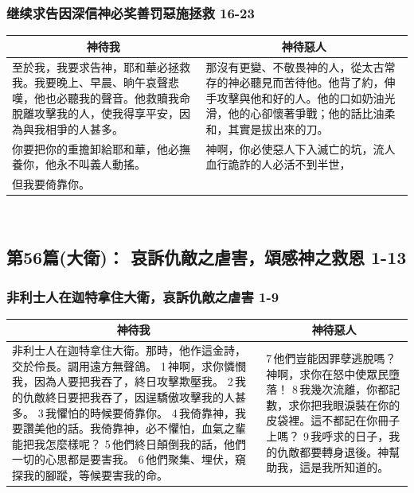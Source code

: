 \subsubsection{继续求告因深信神必奖善罚惡施拯救 16-23}
\begin{table}[H]
\centering
\begin{tabular}{p{8.5cm}|p{9.2500cm}}\hline\hline
\multicolumn{1}{c|}{神待我}&\multicolumn{1}{c}{神待惡人}\\\hline
至於我，我要求告神，耶和華必拯救我。我要晚上、早晨、晌午哀聲悲嘆，他也必聽我的聲音。他救贖我命脫離攻擊我的人，使我得享平安，因為與我相爭的人甚多。&那沒有更變、不敬畏神的人，從太古常存的神必聽見而苦待他。他背了約，伸手攻擊與他和好的人。他的口如奶油光滑，他的心卻懷著爭戰；他的話比油柔和，其實是拔出來的刀。\\\hline
你要把你的重擔卸給耶和華，他必撫養你，他永不叫義人動搖。&神啊，你必使惡人下入滅亡的坑，流人血行詭詐的人必活不到半世，\\\hline
但我要倚靠你。&\\\hline
\end{tabular}
\end{table} 


\subsection{第56篇(大衛)： 哀訴仇敵之虐害，頌感神之救恩 1-13}
\subsubsection{非利士人在迦特拿住大衛，哀訴仇敵之虐害 1-9}
\begin{table}[H]
\centering
\begin{tabular}{p{11.75cm}|p{5.75cm}}\hline\hline
\multicolumn{1}{c|}{神待我}&\multicolumn{1}{c}{神待惡人}\\\hline
非利士人在迦特拿住大衛。那時，他作這金詩，交於伶長。調用遠方無聲鴿。
1 神啊，求你憐憫我，因為人要把我吞了，終日攻擊欺壓我。
2 我的仇敵終日要把我吞了，因逞驕傲攻擊我的人甚多。
3 我懼怕的時候要倚靠你。
4 我倚靠神，我要讚美他的話。我倚靠神，必不懼怕，血氣之輩能把我怎麼樣呢？
5 他們終日顛倒我的話，他們一切的心思都是要害我。
6 他們聚集、埋伏，窺探我的腳蹤，等候要害我的命。
&7 他們豈能因罪孽逃脫嗎？神啊，求你在怒中使眾民墮落！
8 我幾次流離，你都記數，求你把我眼淚裝在你的皮袋裡。這不都記在你冊子上嗎？
9 我呼求的日子，我的仇敵都要轉身退後。神幫助我，這是我所知道的。\\\hline
\end{tabular}
\end{table} 

